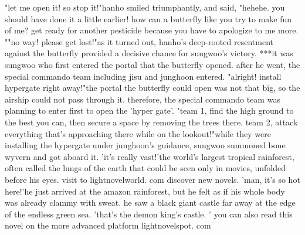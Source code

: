 "let me open it! so stop it!"hanho smiled triumphantly, and said, "hehehe.
 you should have done it a little earlier! how can a butterfly like you try to make fun of me? get ready for another pesticide because you have to apologize to me more.
""no way! please get lost!"as it turned out, hanho's deep-rooted resentment against the butterfly provided a decisive chance for sungwoo's victory.
 ***it was sungwoo who first entered the portal that the butterfly opened.
after he went, the special commando team including jisu and junghoon entered.
"alright! install hypergate right away!"the portal the butterfly could open was not that big, so the airship could not pass through it.
 therefore, the special commando team was planning to enter first to open the 'hyper gate'.
"team 1, find the high ground to the best you can, then secure a space by removing the trees there.
 team 2, attack everything that's approaching there while on the lookout!"while they were installing the hypergate under junghoon's guidance, sungwoo summoned bone wyvern and got aboard it.
 'it's really vast!'the world's largest tropical rainforest, often called the lungs of the earth that could be seen only in movies, unfolded before his eyes.
visit to lightnovelworld.
com discover new novels.
'man, it's so hot here!'he just arrived at the amazon rainforest, but he felt as if his whole body was already clammy with sweat.
 he saw a black giant castle far away at the edge of the endless green sea.
'that's the demon king's castle.
' you can also read this novel on the more advanced platform lightnovelspot.
com

 